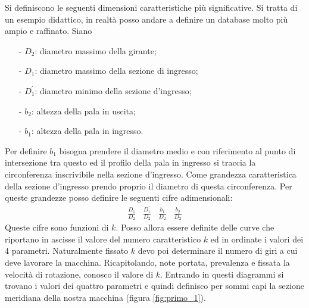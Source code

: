 Si definiscono le seguenti dimensioni caratteristiche più significative. Si tratta di un esempio didattico, in realtà posso andare a definire un database molto più ampio e raffinato. Siano
\begin{itemize}
\item[-]$D_2$: diametro massimo della girante;\\
\item[-]$D_1$: diametro massimo della sezione di ingresso;\\
\item[-]$D_1^{'}$: diametro minimo della sezione d'ingresso;\\
\item[-]$b_2$: altezza della pala in uscita;\\
\item[-]$b_1$: altezza della pala in ingresso.
\end{itemize}
Per definire $b_1$ bisogna prendere il diametro medio e con riferimento al punto di intersezione tra questo ed il profilo della pala in ingresso si traccia la circonferenza inscrivibile nella sezione d’ingresso. Come grandezza caratteristica della sezione d’ingresso prendo proprio il diametro di questa circonferenza.
Per queste grandezze posso definire le seguenti cifre adimensionali:
\begin{align*}
\frac{D_1}{D_2} \; \; \; \frac{D_1^{'}}{D_2} \; \; \; \frac{b_1}{D_2} \; \; \; \frac{b_2}{D_2} 
\end{align*}
Queste cifre sono funzioni di $k$. Posso allora essere definite delle curve che riportano in ascisse il valore del numero caratteristico $k$ ed in ordinate i valori dei 4 parametri.
Naturalmente fissato $k$ devo poi determinare il numero di giri a cui deve lavorare la macchina. 
Ricapitolando, note portata, prevalenza e fissata la velocità di rotazione, conosco il valore di $k$. Entrando in questi diagrammi si trovano i valori dei quattro parametri e quindi definisco per sommi capi la sezione meridiana della nostra macchina (figura \ref{fig:primo_1}).


